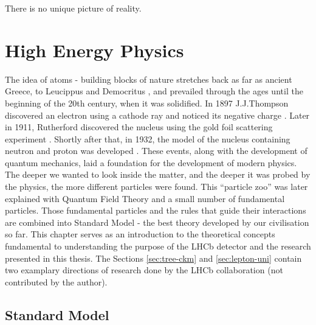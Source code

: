 \begin{savequote}[75mm]
  There is no unique picture of reality.
\end{savequote}

\chapter{High Energy Physics}

The idea of atoms - building blocks of nature stretches back as far as ancient Greece, to Leucippus and Democritus \cite{10.3138/9781442671102}, and prevailed through the ages until the beginning of the 20th century, when it was solidified. In 1897 J.J.Thompson discovered an electron using a cathode ray and noticed its negative charge \cite{thomson1901bodies}.
Later in 1911, Rutherford discovered the nucleus using the gold foil scattering experiment \cite{doi:10.1080/14786440508637080}.
Shortly after that, in 1932, the model of the nucleus containing neutron and proton was developed \cite{Iwanenko1932TheNH, 1932ZPhy...77....1H}.
These events, along with the development of quantum mechanics, laid a foundation for the development of modern physics.
The deeper we wanted to look inside the matter, and the deeper it  was probed by the physics, the more different particles were found.
This ``particle zoo'' was later explained with Quantum Field Theory and a small number of fundamental particles.
Those fundamental particles and the rules that guide their interactions are combined into Standard Model - the best theory developed by our civilisation so far.
This chapter serves as an introduction to the theoretical concepts fundamental to understanding the purpose of the LHCb detector and the research presented in this thesis.
The Sections \ref{sec:tree-ckm} and \ref{sec:lepton-uni} contain two examplary directions of research done by the LHCb collaboration (not contributed by the author).

\section{Standard Model}

